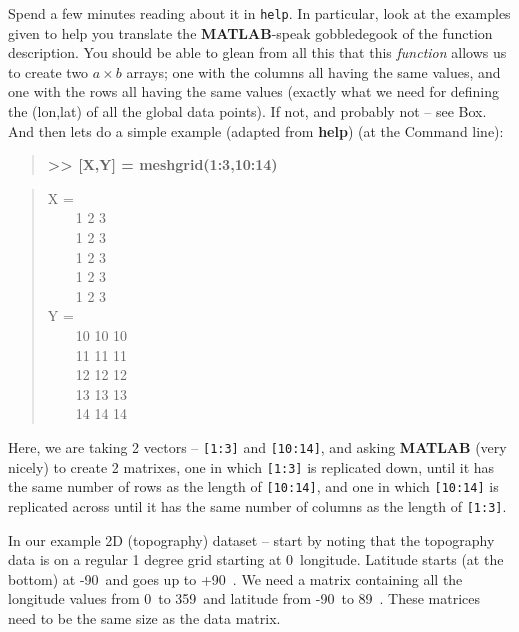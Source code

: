 \documentclass{tufte-book} %
\newenvironment{docspec}{\begin{quotation}\ttfamily\parskip0pt\parindent0pt\ignorespaces}{\end{quotation}}
\newenvironment{docspecbold}{\begin{quotation}\ttfamily\bfseries\parskip0pt\parindent0pt\ignorespaces}{\end{quotation}}
\begin{document}
Spend a few minutes reading about it in \texttt{help}. In particular, look at the examples given to help you translate the \textbf{MATLAB}-speak gobbledegook of the function description. You should be able to glean from all this that this \textit{function} allows us to create two \(a\times b\) arrays; one with the columns all having the same values, and one with the rows all having the same values (exactly what we need for defining the (lon,lat) of all the global data points). If not, and probably not -- see Box. And then lets do a simple example (adapted from \textbf{help}) (at the Command line):
\begin{docspecbold}
>> [X,Y] = meshgrid(1:3,10:14)
\end{docspecbold}
\begin{docspec}
X =
\\ \ \ \ \ 1     2     3
\\ \ \ \ \ 1     2     3
\\ \ \ \ \ 1     2     3
\\ \ \ \ \ 1     2     3
\\ \ \ \ \ 1     2     3
\\Y =
\\ \ \ \ \ 10    10    10
\\ \ \ \ \ 11    11    11
\\ \ \ \ \ 12    12    12
\\ \ \ \ \ 13    13    13
\\ \ \ \ \ 14    14    14
\end{docspec}
Here, we are taking 2 vectors -- \texttt{[1:3]} and \texttt{[10:14]}, and asking \textbf{MATLAB} (very nicely) to create 2 matrixes, one in which \texttt{[1:3]} is replicated down, until it has the same number of rows as the length of \texttt{[10:14]}, and one in which \texttt{[10:14]} is replicated across until it has the same number of columns as the length of \texttt{[1:3]}.

In our example 2D (topography) dataset -- start by noting that the topography data is on a regular 1 degree grid starting at 0\degree\ longitude. Latitude starts (at the bottom) at -90\degree\ and goes up to +90\degree\ . We need a matrix containing all the longitude values from 0\degree\ to 359\degree\, and latitude from -90\degree\ to 89\degree\ . These matrices need to be the same size as the data matrix.
\end{document}
